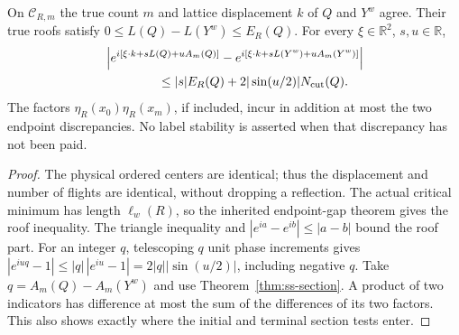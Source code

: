 \begin{proposition}
\label{prop:ss-twists}
On $\mathcal C_{R,m}$ the true count $m$ and lattice displacement $k$
of $Q$ and $Y^w$ agree. Their true roofs satisfy
$0\le L(Q)-L(Y^w)\le E_R(Q)$. For every
$\xi\in\mathbb R^2$, $s,u\in\mathbb R$,
\begin{align}\label{eq:ss-twist}
 &\left|e^{i[\xi\cdot k+sL(Q)+uA_m(Q)]}
         -e^{i[\xi\cdot k+sL(Y^w)+uA_m(Y^w)]}\right|\notag\\
 &\hspace{15mm}\le |s|E_R(Q)+2|\sin(u/2)|N_{\rm cut}(Q).
\end{align}
The factors $\eta_R(x_0)\eta_R(x_m)$, if included, incur in addition
at most the two endpoint discrepancies. No label stability is asserted
when that discrepancy has not been paid.
\end{proposition}
\begin{proof}
The physical ordered centers are identical; thus the displacement and
number of flights are identical, without dropping a reflection.
The actual critical minimum has length $\ell_w(R)$, so the inherited
endpoint-gap theorem gives the roof inequality. The triangle
inequality and $|e^{ia}-e^{ib}|\le|a-b|$ bound the roof part.
For an integer $q$, telescoping $q$ unit phase increments gives
$|e^{iuq}-1|\le |q|\,|e^{iu}-1|=2|q||\sin(u/2)|$,
including negative $q$. Take $q=A_m(Q)-A_m(Y^w)$ and use
Theorem~\ref{thm:ss-section}. A product of two indicators has difference
at most the sum of the differences of its two factors. This also
shows exactly where the initial and terminal section tests enter.
\end{proof}

